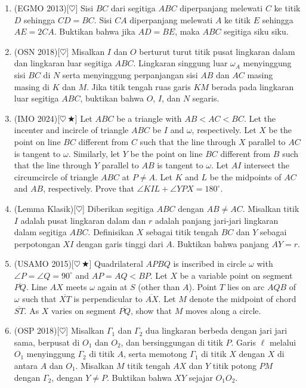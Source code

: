 \documentclass[letterpaper, 13pt]{scrartcl}
\begin{document}
\begin{enumerate}
  \item (EGMO 2013)[$\heartsuit$] Sisi $BC$ dari segitiga $ABC$ diperpanjang melewati $C$ ke titik $D$ sehingga $CD = BC$. Sisi $CA$ diperpanjang melewati $A$ ke titik $E$ sehingga $AE = 2CA$. Buktikan bahwa jika $AD = BE$, maka $ABC$ segitiga siku siku.

  \item (OSN 2018)[$\heartsuit$] Misalkan $I$ dan $O$ berturut turut titik pusat lingkaran dalam dan lingkaran luar segitiga $ABC$. Lingkaran singgung luar $\omega_A$ menyinggung sisi $BC$ di $N$ serta menyinggung perpanjangan sisi $AB$ dan $AC$ masing masing di $K$ dan $M$. Jika titik tengah ruas garis $KM$ berada pada lingkaran luar segitiga $ABC$, buktikan bahwa $O$, $I$, dan $N$ segaris.

  \item (IMO 2024)[$\heartsuit\,\bigstar$] Let $ABC$ be a triangle with $AB < AC < BC$. Let the incenter and incircle of triangle $ABC$ be $I$ and $\omega$, respectively. Let $X$ be the point on line $BC$ different from $C$ such that the line through $X$ parallel to $AC$ is tangent to $\omega$. Similarly, let $Y$ be the point on line $BC$ different from $B$ such that the line through $Y$ parallel to $AB$ is tangent to $\omega$. Let $AI$ intersect the circumcircle of triangle $ABC$ at $P \ne A$. Let $K$ and $L$ be the midpoints of $AC$ and $AB$, respectively. Prove that $\angle KIL + \angle YPX = 180^{\circ}$.


  \item (Lemma Klasik)[$\heartsuit$] Diberikan segitiga $ABC$ dengan $AB \neq AC$. Misalkan titik $I$ adalah pusat lingkaran dalam dan $r$ adalah panjang jari-jari lingkaran dalam segitiga $ABC$. Definisikan $X$ sebagai titik tengah $BC$ dan $Y$ sebagai perpotongan $XI$ dengan garis tinggi dari $A$. Buktikan bahwa panjang $AY = r$.

  \newpage
  \item (USAMO 2015)[$\heartsuit\,\bigstar$] Quadrilateral $APBQ$ is inscribed in circle $\omega$ with $\angle P = \angle Q = 90^{\circ}$ and $AP = AQ < BP$. Let $X$ be a variable point on segment $\overline{PQ}$. Line $AX$ meets $\omega$ again at $S$ (other than $A$). Point $T$ lies on arc $AQB$ of $\omega$ such that $\overline{XT}$ is perpendicular to $\overline{AX}$. Let $M$ denote the midpoint of chord $\overline{ST}$. As $X$ varies on segment $\overline{PQ}$, show that $M$ moves along a circle.

  \item (OSP 2018)[$\heartsuit$] Misalkan $\Gamma_1$ dan $\Gamma_2$ dua lingkaran berbeda dengan jari jari sama, berpusat di $O_1$ dan $O_2$, dan bersinggungan di titik $P$. Garis $\ell$ melalui $O_1$ menyinggung $\Gamma_2$ di titik $A$, serta memotong $\Gamma_1$ di titik $X$ dengan $X$ di antara $A$ dan $O_1$. Misalkan $M$ titik tengah $AX$ dan $Y$ titik potong $PM$ dengan $\Gamma_2$, dengan $Y \neq P$. Buktikan bahwa $XY$ sejajar $O_1O_2$.


\end{enumerate}
\end{document}
